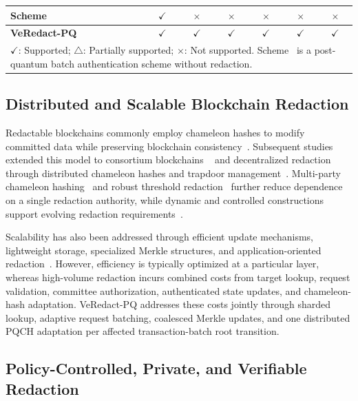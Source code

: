 \documentclass[lettersize,journal]{IEEEtran}
\begin{document}
\begin{table}[t]
\begin{tabular}{lcccccc}
\textcolor{e2}{Scheme~\cite{ref39}}
& \textcolor{e2}{$\checkmark$} & \textcolor{e2}{$\times$} & \textcolor{e2}{$\times$} & \textcolor{e2}{$\times$}
& \textcolor{e2}{$\times$} & \textcolor{e2}{$\times$} \\

\hline
\textbf{VeRedact-PQ}
& $\checkmark$ & $\checkmark$ & $\checkmark$
& $\checkmark$ & $\checkmark$ & $\checkmark$ \\
\hline

\multicolumn{7}{l}{
\footnotesize $\checkmark$: Supported;
$\triangle$: Partially supported;
$\times$: Not supported. \textcolor{e2}{Scheme~\cite{ref39} is a
post-quantum batch authentication scheme without redaction.}}
\end{tabular}
\end{table}
    \subsection{Distributed and Scalable Blockchain Redaction}
    
    Redactable blockchains commonly employ chameleon hashes to modify
    committed data while preserving blockchain consistency~\cite{ref9}.
    Subsequent studies extended this model to consortium blockchains
    ~\cite{ref2} and decentralized redaction through distributed chameleon
    hashes and trapdoor management~\cite{ref1,ref3,ref6,ref19}.
    Multi-party chameleon hashing~\cite{ref12} and robust threshold
    redaction~\cite{ref27} further reduce dependence on a single redaction
    authority, while dynamic and controlled constructions support evolving
    redaction requirements~\cite{ref5,ref16,ref36}.
    
    Scalability has also been addressed through efficient update
    mechanisms, lightweight storage, specialized Merkle structures, and
    application-oriented redaction~\cite{ref14,ref20,ref21,ref23,ref26}.
    However, efficiency is typically optimized at a particular layer,
    whereas high-volume redaction incurs combined costs from target lookup,
    request validation, committee authorization, authenticated state
    updates, and chameleon-hash adaptation. VeRedact-PQ addresses these
    costs jointly through sharded lookup, adaptive request batching,
    coalesced Merkle updates, and one distributed PQCH adaptation per
    affected transaction-batch root transition.
    
    \subsection{Policy-Controlled, Private, and Verifiable Redaction}
    
\end{document}
